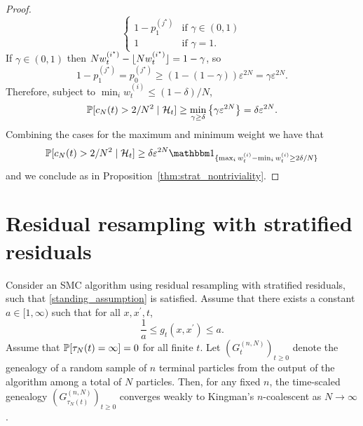 \begin{proof}
\begin{equation*}
\begin{cases}
    1 - p_1^{(j^\star)} & \text{if } \gamma \in (0,1) \\
    1 & \text{if } \gamma = 1 .
\end{cases}
\end{equation*}
If $\gamma \in (0,1)$ then
$N w_t^{(i^\star)} - \flnw[i^\star] = 1- \gamma$, so
\begin{equation*}
1 - p_1^{(j^\star)}
= p_0^{(j^\star)}
\geq ( 1- (1-\gamma) ) \varepsilon^{2N}
= \gamma \varepsilon^{2N} .
\end{equation*}
Therefore, subject to $\min_i w_t^{(i)} \leq (1-\delta)/N$,
\begin{equation*}
\Prob[ c_N(t) > 2/N^2 \mid \mathcal{H}_t ]
\geq \min_{\gamma \geq \delta} 
        \left\{ \gamma \varepsilon^{2N} %
        \right\}
= \delta \varepsilon^{2N} .
\end{equation*}
Combining the cases for the maximum and minimum weight we have that
\begin{equation*}
\Prob[ c_N(t) > 2/N^2 \mid \mathcal{H}_t ] 
\geq \delta \varepsilon^{2N} \I{ \max_i w_t^{(i)} - \min_i w_t^{(i)} \geq 2\delta/N }
\end{equation*}
and we conclude as in Proposition~\ref{thm:strat_nontriviality}.
\end{proof}




\section{Residual resampling with stratified residuals}
\label{sec:corol_resstrat}

\begin{corollary}\label{thm:residual_stratified}
Consider an SMC algorithm using residual resampling with stratified residuals, such that \ref{standing_assumption} is satisfied.
Assume that there exists a constant $a\in [1,\infty)$ such that for all $x, x^\prime, t$,
\begin{equation*}
\frac{1}{a} \leq g_t(x, x^\prime) \leq a .
\end{equation*}
Assume that $\Prob[ \tau_N(t) = \infty] =0$ for all finite $t$.
Let $(G_t^{(n,N)})_{t\geq0}$ denote the genealogy of a random sample of $n$ terminal particles from the output of the algorithm among a total of $N$ particles. Then, for any fixed $n$, the time-scaled genealogy $(G_{\tau_N(t)}^{(n,N)})_{t\geq0}$ converges weakly to Kingman's $n$-coalescent as $N\to \infty$.%
\end{corollary}

